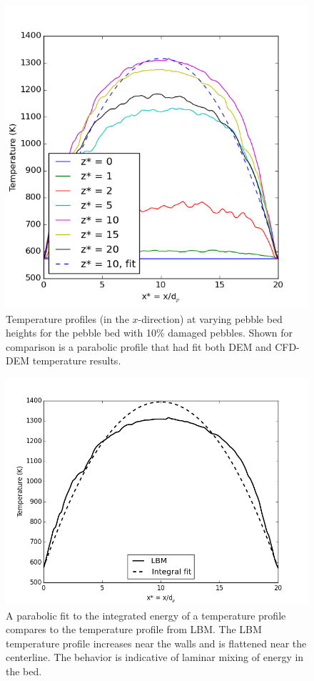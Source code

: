\begin{figure}[t]
    \centering
    \includegraphics[width=\singleimagewidth]{chapters/figures/lbm/lbm-temp-profiles}
    \caption{Temperature profiles (in the $x$-direction) at varying pebble bed heights for the pebble bed with 10\% damaged pebbles. Shown for comparison is a parabolic profile that had fit both DEM and CFD-DEM temperature results.}\label{fig:lbm-temp-profiles}
\end{figure}

\begin{figure}[t]
    \centering
    \includegraphics[width=\singleimagewidth]{chapters/figures/lbm/lbm-temp-profile_parabolic}
    \caption{A parabolic fit to the integrated energy of a temperature profile compares to the temperature profile from LBM. The LBM temperature profile increases near the walls and is flattened near the centerline. The behavior is indicative of laminar mixing of energy in the bed.}\label{fig:lbm-temp-parabolas}
\end{figure}

